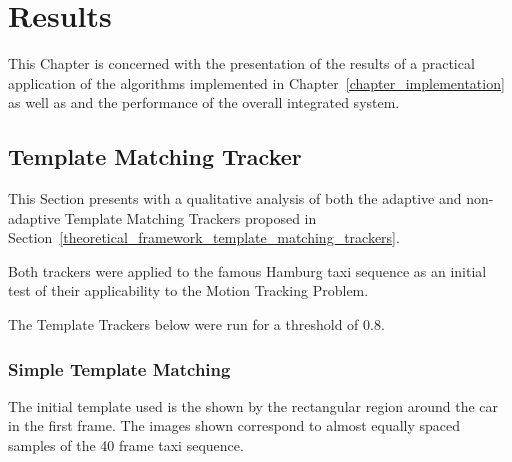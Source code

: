 \chapter{Results}\label{chapter_results}

This Chapter is concerned with the presentation of the results of a practical
application of the algorithms implemented in
Chapter~\ref{chapter_implementation} as well as and the performance of the
overall integrated system.

\section{Template Matching Tracker}
This Section presents with a qualitative analysis of both the adaptive and
non-adaptive Template Matching Trackers proposed in
Section~\ref{theoretical_framework_template_matching_trackers}. 

Both trackers were applied to the famous Hamburg taxi sequence \cite{} as an initial
test of their applicability to the Motion Tracking Problem.

The Template Trackers below were run for a threshold of 0.8.

\subsection{Simple Template Matching}\label{results_simple_template_matching}
The initial template used is the shown by the rectangular region around the car
in the first frame. The images shown correspond to almost equally spaced
samples of the 40 frame taxi sequence.

